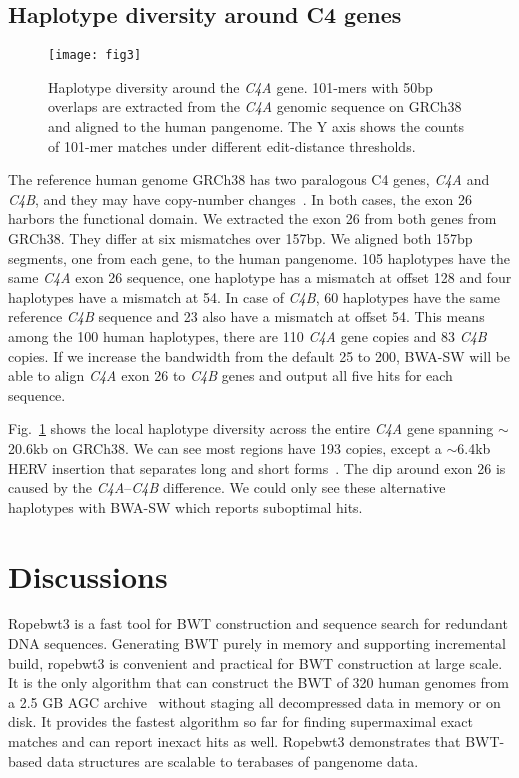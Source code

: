 \documentclass[webpdf,contemporary,large,namedate]{oup-authoring-template}%
\begin{document}
\subsection{Haplotype diversity around C4 genes}

\begin{figure}[tb]
\texttt{[image: fig3]}
\caption{Haplotype diversity around the \emph{C4A} gene.
101-mers with 50bp overlaps are extracted from the \emph{C4A} genomic sequence on GRCh38
and aligned to the human pangenome.
The Y axis shows the counts of 101-mer matches under different edit-distance thresholds.}\label{fig:c4}
\end{figure}

The reference human genome GRCh38 has two paralogous C4 genes, \emph{C4A} and \emph{C4B}, and they may have copy-number changes~\citep{Sekar:2016aa}.
In both cases, the exon 26 harbors the functional domain.
We extracted the exon 26 from both genes from GRCh38.
They differ at six mismatches over 157bp.
We aligned both 157bp segments, one from each gene, to the human pangenome.
105 haplotypes have the same \emph{C4A} exon 26 sequence, one haplotype has a mismatch at offset 128 and four haplotypes have a mismatch at 54.
In case of \emph{C4B}, 60 haplotypes have the same reference \emph{C4B} sequence and 23 also have a mismatch at offset 54.
This means among the 100 human haplotypes, there are 110 \emph{C4A} gene copies and 83 \emph{C4B} copies.
If we increase the bandwidth from the default 25 to 200, BWA-SW will be able to align \emph{C4A} exon 26 to \emph{C4B} genes
and output all five hits for each sequence.

Fig.~\ref{fig:c4} shows the local haplotype diversity across the entire \emph{C4A} gene spanning $\sim$20.6kb on GRCh38.
We can see most regions have 193 copies, except a $\sim$6.4kb HERV insertion that separates long and short forms~\citep{Sekar:2016aa}.
The dip around exon 26 is caused by the \emph{C4A}--\emph{C4B} difference.
We could only see these alternative haplotypes with BWA-SW which reports suboptimal hits.

\section{Discussions}

Ropebwt3 is a fast tool for BWT construction and sequence search for redundant DNA sequences.
Generating BWT purely in memory and supporting incremental build, ropebwt3 is convenient and practical for BWT construction at large scale.
It is the only algorithm that can construct the BWT of 320 human genomes from a 2.5 GB AGC archive~\citep{Deorowicz:2023ab} without staging all decompressed data in memory or on disk.
It provides the fastest algorithm so far for finding supermaximal exact matches and can report inexact hits as well.
Ropebwt3 demonstrates that BWT-based data structures are scalable to terabases of pangenome data.
\end{document}
